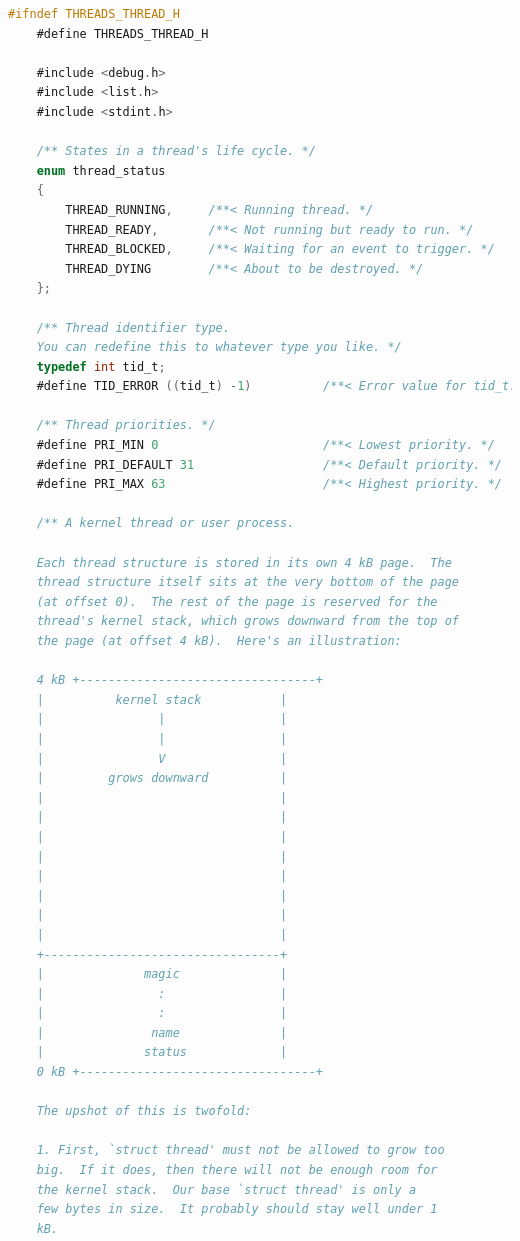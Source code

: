 \documentclass{article}
\begin{document}
\begin{lstlisting}[language=C, title=\texttt{pintos/src/threads/thread.h}]
	#ifndef THREADS_THREAD_H
	#define THREADS_THREAD_H
	
	#include <debug.h>
	#include <list.h>
	#include <stdint.h>
	
	/** States in a thread's life cycle. */
	enum thread_status
	{
		THREAD_RUNNING,     /**< Running thread. */
		THREAD_READY,       /**< Not running but ready to run. */
		THREAD_BLOCKED,     /**< Waiting for an event to trigger. */
		THREAD_DYING        /**< About to be destroyed. */
	};
	
	/** Thread identifier type.
	You can redefine this to whatever type you like. */
	typedef int tid_t;
	#define TID_ERROR ((tid_t) -1)          /**< Error value for tid_t. */
	
	/** Thread priorities. */
	#define PRI_MIN 0                       /**< Lowest priority. */
	#define PRI_DEFAULT 31                  /**< Default priority. */
	#define PRI_MAX 63                      /**< Highest priority. */
	
	/** A kernel thread or user process.
	
	Each thread structure is stored in its own 4 kB page.  The
	thread structure itself sits at the very bottom of the page
	(at offset 0).  The rest of the page is reserved for the
	thread's kernel stack, which grows downward from the top of
	the page (at offset 4 kB).  Here's an illustration:
	
	4 kB +---------------------------------+
	|          kernel stack           |
	|                |                |
	|                |                |
	|                V                |
	|         grows downward          |
	|                                 |
	|                                 |
	|                                 |
	|                                 |
	|                                 |
	|                                 |
	|                                 |
	|                                 |
	+---------------------------------+
	|              magic              |
	|                :                |
	|                :                |
	|               name              |
	|              status             |
	0 kB +---------------------------------+
	
	The upshot of this is twofold:
	
	1. First, `struct thread' must not be allowed to grow too
	big.  If it does, then there will not be enough room for
	the kernel stack.  Our base `struct thread' is only a
	few bytes in size.  It probably should stay well under 1
	kB.
	

\end{lstlisting}
\end{document}
